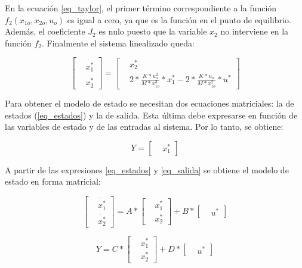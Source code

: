 En la ecuación \ref{eq_taylor}, el primer término correspondiente a la función $f_2(x_{1o},x_{2o},u_o)$ es igual a cero, ya que es la función en el punto de equilibrio. Además, el coeficiente $J_2$ es nulo puesto que la variable $x_2$ no interviene en la función $f_2$. Finalmente el sistema linealizado queda: 


\begin{equation} \label{eq_estados}
	\begin{bmatrix}
		&\dot{x_{1}^*}\\
		&\dot{x_{2}^*}
	\end{bmatrix}
	=
	\begin{bmatrix}
		&x_{2}^*\\
		&2*\frac{K*u_{o}^{2}}{M*x_{1o}^{3}}*x_1^*-2*\frac{K*u_{o}}{M*x_{1o}^{2}}*u^*
	\end{bmatrix}
\end{equation}

Para obtener el modelo de estado se necesitan dos ecuaciones matriciales: la de estados (\ref{eq_estados}) y la de salida. Esta última debe expresarse en función de las variables de estado y de las entradas al sistema. Por lo tanto, se obtiene:

\begin{equation} \label{eq_salida}
	Y=
	\begin{bmatrix}
		&x_{1}^*	
	\end{bmatrix}
\end{equation}

A partir de las expresiones \ref{eq_estados} y \ref{eq_salida} se obtiene el modelo de estado en forma matricial:

\begin{equation*} 
	\begin{bmatrix}
		&\dot{x_{1}^*}\\
		&\dot{x_{2}^*}
	\end{bmatrix}
	=
	A*
	\begin{bmatrix}
		&x_{1}^*\\
		&x_{2}^*
	\end{bmatrix}
	+ B* 
	\begin{bmatrix}		
		&u^*
	\end{bmatrix}
\end{equation*}

\begin{equation*} 
	Y
	=
	C*
	\begin{bmatrix}
		&x_{1}^*\\
		&x_{2}^*
	\end{bmatrix}
	+ D* 
	\begin{bmatrix}		
		&u^*
	\end{bmatrix}
\end{equation*}

